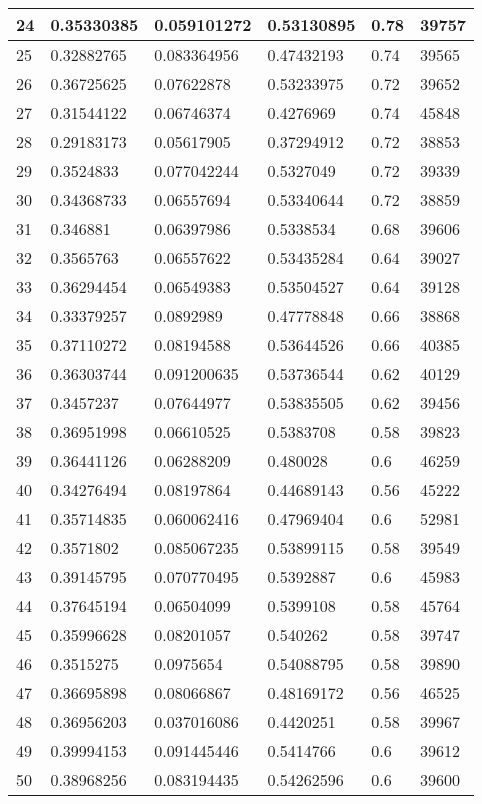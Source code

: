 \begin{longtable}{|l|l|l|l|l|l|}
24 & 0.35330385 & 0.059101272 & 0.53130895 & 0.78 & 39757 \\ \hline 
25 & 0.32882765 & 0.083364956 & 0.47432193 & 0.74 & 39565 \\ \hline 
26 & 0.36725625 & 0.07622878 & 0.53233975 & 0.72 & 39652 \\ \hline 
27 & 0.31544122 & 0.06746374 & 0.4276969 & 0.74 & 45848 \\ \hline 
28 & 0.29183173 & 0.05617905 & 0.37294912 & 0.72 & 38853 \\ \hline 
29 & 0.3524833 & 0.077042244 & 0.5327049 & 0.72 & 39339 \\ \hline 
30 & 0.34368733 & 0.06557694 & 0.53340644 & 0.72 & 38859 \\ \hline 
31 & 0.346881 & 0.06397986 & 0.5338534 & 0.68 & 39606 \\ \hline 
32 & 0.3565763 & 0.06557622 & 0.53435284 & 0.64 & 39027 \\ \hline 
33 & 0.36294454 & 0.06549383 & 0.53504527 & 0.64 & 39128 \\ \hline 
34 & 0.33379257 & 0.0892989 & 0.47778848 & 0.66 & 38868 \\ \hline 
35 & 0.37110272 & 0.08194588 & 0.53644526 & 0.66 & 40385 \\ \hline 
36 & 0.36303744 & 0.091200635 & 0.53736544 & 0.62 & 40129 \\ \hline 
37 & 0.3457237 & 0.07644977 & 0.53835505 & 0.62 & 39456 \\ \hline 
38 & 0.36951998 & 0.06610525 & 0.5383708 & 0.58 & 39823 \\ \hline 
39 & 0.36441126 & 0.06288209 & 0.480028 & 0.6 & 46259 \\ \hline 
40 & 0.34276494 & 0.08197864 & 0.44689143 & 0.56 & 45222 \\ \hline 
41 & 0.35714835 & 0.060062416 & 0.47969404 & 0.6 & 52981 \\ \hline 
42 & 0.3571802 & 0.085067235 & 0.53899115 & 0.58 & 39549 \\ \hline 
43 & 0.39145795 & 0.070770495 & 0.5392887 & 0.6 & 45983 \\ \hline 
44 & 0.37645194 & 0.06504099 & 0.5399108 & 0.58 & 45764 \\ \hline 
45 & 0.35996628 & 0.08201057 & 0.540262 & 0.58 & 39747 \\ \hline 
46 & 0.3515275 & 0.0975654 & 0.54088795 & 0.58 & 39890 \\ \hline 
47 & 0.36695898 & 0.08066867 & 0.48169172 & 0.56 & 46525 \\ \hline 
48 & 0.36956203 & 0.037016086 & 0.4420251 & 0.58 & 39967 \\ \hline 
49 & 0.39994153 & 0.091445446 & 0.5414766 & 0.6 & 39612 \\ \hline 
50 & 0.38968256 & 0.083194435 & 0.54262596 & 0.6 & 39600 \\ \hline 
\end{longtable}